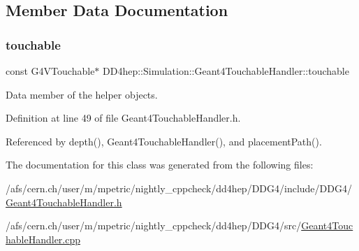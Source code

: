 \subsection{Member Data Documentation}
\hypertarget{class_d_d4hep_1_1_simulation_1_1_geant4_touchable_handler_a33a2263e30f96abe93ee3be5a189c3b4}{}\label{class_d_d4hep_1_1_simulation_1_1_geant4_touchable_handler_a33a2263e30f96abe93ee3be5a189c3b4} 
\subsubsection{\texorpdfstring{touchable}{touchable}}
{\footnotesize\ttfamily const G4\+V\+Touchable$\ast$ D\+D4hep\+::\+Simulation\+::\+Geant4\+Touchable\+Handler\+::touchable}



Data member of the helper objects. 



Definition at line 49 of file Geant4\+Touchable\+Handler.\+h.



Referenced by depth(), Geant4\+Touchable\+Handler(), and placement\+Path().



The documentation for this class was generated from the following files\+:\begin{DoxyCompactItemize}
\item 
/afs/cern.\+ch/user/m/mpetric/nightly\+\_\+cppcheck/dd4hep/\+D\+D\+G4/include/\+D\+D\+G4/\hyperlink{_geant4_touchable_handler_8h}{Geant4\+Touchable\+Handler.\+h}\item 
/afs/cern.\+ch/user/m/mpetric/nightly\+\_\+cppcheck/dd4hep/\+D\+D\+G4/src/\hyperlink{_geant4_touchable_handler_8cpp}{Geant4\+Touchable\+Handler.\+cpp}\end{DoxyCompactItemize}
